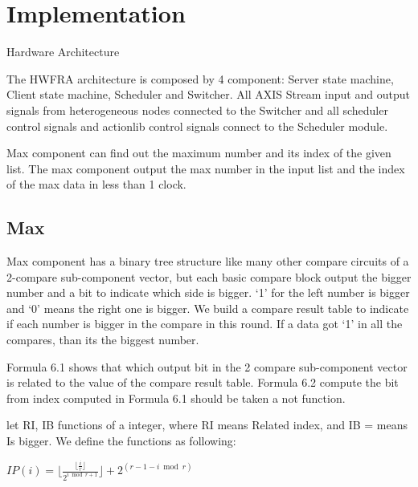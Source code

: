 \chapter{Implementation}
\label{sec:implementation}

Hardware Architecture

The HWFRA architecture is composed by 4 component: Server state machine, Client state machine, Scheduler and Switcher.
All AXIS Stream input and output signals from heterogeneous nodes connected to the Switcher and all scheduler control signals and actionlib control signals connect to the Scheduler module.

Max component can find out the maximum number and its index of the given list. The max component output the max number in the input list and the index of the max data in less than 1 clock.

\section{Max}

Max component has a binary tree structure like many other compare circuits of a 2-compare sub-component vector, but each basic  compare block output the bigger number and a bit to indicate which side is bigger. ‘1’ for the left number is bigger and ‘0’ means the right one is bigger.
We build a compare result table to indicate if each number is bigger in the compare in this round. If a data got ‘1’ in all the compares, than its the biggest number.

Formula 6.1 shows that which output bit in the 2 compare sub-component vector is related to the value of the compare result table. Formula 6.2 compute the bit from index computed in Formula 6.1 should be taken a not function.

let RI, IB functions of a integer, where RI means Related index, and IB = means Is bigger. We define the functions as following: 

$
 IP(i) =\lfloor \frac{\lfloor\frac{i}{r} \rfloor}{2^{i \bmod r + 1}  }\rfloor + 2^{( r -1 - i \bmod r)}
$



